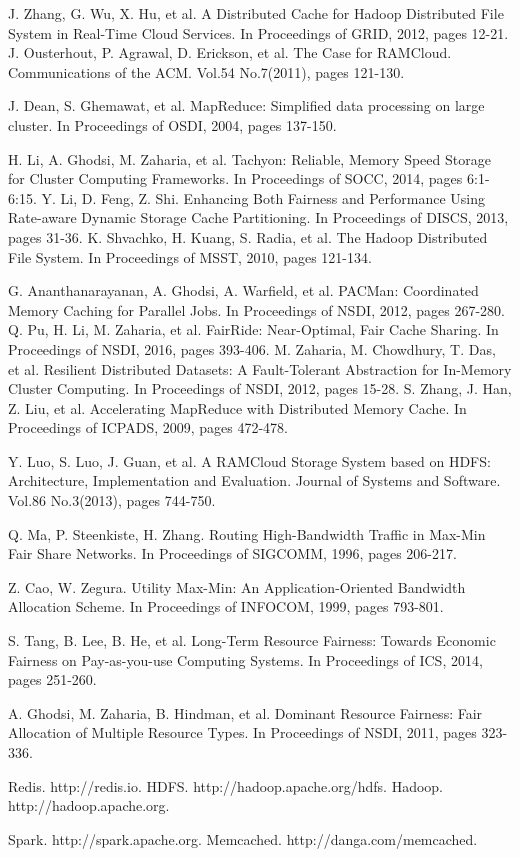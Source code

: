 \documentclass[letterpaper,twocolumn,10pt]{article}
\begin{document}
\begin{thebibliography}{99}%
%
J. Zhang, G. Wu, X. Hu, et al. A Distributed Cache for Hadoop Distributed File System in Real-Time Cloud Services. In Proceedings of GRID, 2012, pages 12-21.
%
J. Ousterhout, P. Agrawal, D. Erickson, et al. The Case for RAMCloud. Communications of the ACM. Vol.54 No.7(2011), pages 121-130.

J. Dean, S. Ghemawat, et al. MapReduce: Simplified data processing on large cluster. In Proceedings of OSDI, 2004, pages 137-150.%

H. Li, A. Ghodsi, M. Zaharia, et al. Tachyon: Reliable, Memory Speed Storage for Cluster Computing Frameworks. In Proceedings of SOCC, 2014, pages 6:1-6:15.
%
Y. Li, D. Feng, Z. Shi. Enhancing Both Fairness and Performance Using Rate-aware Dynamic Storage Cache Partitioning. In Proceedings of DISCS, 2013, pages 31-36.
%
K. Shvachko, H. Kuang, S. Radia, et al. The Hadoop Distributed File System. In Proceedings of MSST, 2010, pages 121-134.
%

G. Ananthanarayanan, A. Ghodsi, A. Warfield, et al. PACMan: Coordinated Memory Caching for Parallel Jobs. In Proceedings of NSDI, 2012, pages 267-280.
%
Q. Pu, H. Li, M. Zaharia, et al. FairRide: Near-Optimal, Fair Cache Sharing. In Proceedings of NSDI, 2016, pages 393-406.
%
M. Zaharia, M. Chowdhury, T. Das, et al. Resilient Distributed Datasets: {A} Fault-Tolerant Abstraction for In-Memory Cluster Computing. In Proceedings of NSDI, 2012, pages 15-28.
%
S. Zhang, J. Han, Z. Liu, et al. Accelerating MapReduce with Distributed Memory Cache. In Proceedings of ICPADS, 2009, pages 472-478.
%

Y. Luo, S. Luo, J. Guan, et al. A RAMCloud Storage System based on HDFS: Architecture, Implementation and Evaluation. Journal of Systems and Software. Vol.86 No.3(2013), pages 744-750.

Q. Ma, P. Steenkiste, H. Zhang. Routing High-Bandwidth Traffic in Max-Min Fair Share Networks. In Proceedings of SIGCOMM, 1996, pages 206-217.

Z. Cao, W. Zegura. Utility Max-Min: An Application-Oriented Bandwidth Allocation Scheme. In Proceedings of INFOCOM, 1999, pages 793-801.

S. Tang, B. Lee, B. He, et al. Long-Term Resource Fairness: Towards Economic Fairness on Pay-as-you-use Computing Systems. In Proceedings of ICS, 2014, pages 251-260.

A. Ghodsi, M. Zaharia, B. Hindman, et al. Dominant Resource Fairness: Fair Allocation of Multiple Resource Types. In Proceedings of NSDI, 2011, pages 323-336.

%
Redis. http://redis.io.
%
HDFS. http://hadoop.apache.org/hdfs.
%
Hadoop. http://hadoop.apache.org.

Spark. http://spark.apache.org.
%
Memcached. http://danga.com/memcached.
\end{thebibliography}
\end{document}
